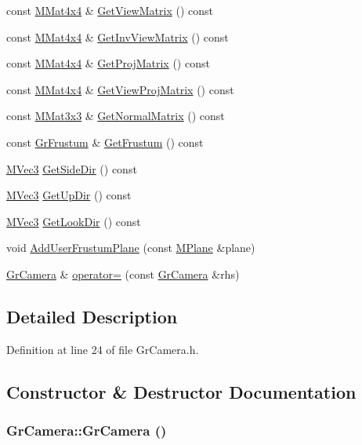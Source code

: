 \begin{CompactItemize}
const \hyperlink{class_m_mat4x4}{MMat4x4} \& \hyperlink{class_gr_camera_792760eaf71f2eb7d7d92fca1897de35}{GetViewMatrix} () const 
\item 
const \hyperlink{class_m_mat4x4}{MMat4x4} \& \hyperlink{class_gr_camera_b8bc71a443e47f9a2accb9c1106ee9e7}{GetInvViewMatrix} () const 
\item 
const \hyperlink{class_m_mat4x4}{MMat4x4} \& \hyperlink{class_gr_camera_e9e5e952d4db5e02b0b120a049fb445a}{GetProjMatrix} () const 
\item 
const \hyperlink{class_m_mat4x4}{MMat4x4} \& \hyperlink{class_gr_camera_a9a8ab5d4d339a769d58e0fa4f1bc823}{GetViewProjMatrix} () const 
\item 
const \hyperlink{class_m_mat3x3}{MMat3x3} \& \hyperlink{class_gr_camera_64e5f5d575f17151768cc1a2ce65ab85}{GetNormalMatrix} () const 
\item 
const \hyperlink{class_gr_frustum}{GrFrustum} \& \hyperlink{class_gr_camera_2ac192689362a2d6227aaae330f08473}{GetFrustum} () const 
\item 
\hyperlink{class_m_vec3}{MVec3} \hyperlink{class_gr_camera_c6d5b9f6b4756f788cf1754b68564241}{GetSideDir} () const 
\item 
\hyperlink{class_m_vec3}{MVec3} \hyperlink{class_gr_camera_7a50df3ed83d8b43e146cb26f07482f5}{GetUpDir} () const 
\item 
\hyperlink{class_m_vec3}{MVec3} \hyperlink{class_gr_camera_44d0c54e506b49a0e894700d6366741e}{GetLookDir} () const 
\item 
void \hyperlink{class_gr_camera_1b10bccef56e0cc3072df740388adc71}{AddUserFrustumPlane} (const \hyperlink{class_m_plane}{MPlane} \&plane)
\item 
\hyperlink{class_gr_camera}{GrCamera} \& \hyperlink{class_gr_camera_84bbadfceeb70f60ff81775d85a21a1f}{operator=} (const \hyperlink{class_gr_camera}{GrCamera} \&rhs)
\end{CompactItemize}


\subsection{Detailed Description}


Definition at line 24 of file GrCamera.h.

\subsection{Constructor \& Destructor Documentation}
\hypertarget{class_gr_camera_06a0223e496154f4b35e4a81038c8cf1}{
\subsubsection[{GrCamera}]{\setlength{\rightskip}{0pt plus 5cm}GrCamera::GrCamera ()}}
\label{class_gr_camera_06a0223e496154f4b35e4a81038c8cf1}




